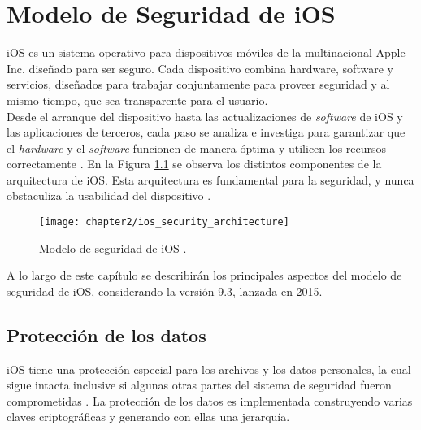 \chapter{Modelo de Seguridad de iOS}
iOS es un sistema operativo para dispositivos móviles de la multinacional Apple Inc. diseñado para ser
seguro. Cada dispositivo combina hardware, software y servicios, diseñados para trabajar
conjuntamente para proveer seguridad y al mismo tiempo, que sea transparente para el
usuario.\\

Desde el arranque del dispositivo hasta las actualizaciones de \emph{software} de iOS y las aplicaciones de terceros, cada paso se analiza e investiga para garantizar que el \emph{hardware} y el \emph{software} funcionen de manera óptima y utilicen los recursos correctamente \cite{asg}. En la Figura \ref{fig:ch02:security-architecture} se observa los distintos componentes de la arquitectura de iOS. Esta arquitectura es fundamental para la seguridad, y nunca obstaculiza la usabilidad del dispositivo \cite{asg}.\\

\begin{figure}[htbp]
    \centering
    \texttt{[image: chapter2/ios\_security\_architecture]}
    \caption{Modelo de seguridad de iOS \cite{asg}.} 
    \label{fig:ch02:security-architecture}
\end{figure}
A lo largo de este capítulo se describirán los principales aspectos del modelo de seguridad de iOS, considerando la versión 9.3, lanzada en 2015.
\section{Protección de los datos} \label{fig:ch02:data-protection}
iOS tiene una protección especial para los archivos y los datos personales, la cual sigue intacta inclusive si algunas otras partes del sistema de seguridad fueron comprometidas \cite{asg}. La protección de los datos es implementada construyendo varias claves criptográficas y generando con ellas una jerarquía.\\

